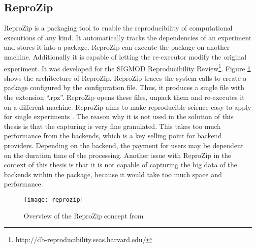 \documentclass[draft,final]{vutinfth} %
\begin{document}
\subsection{ReproZip}\label{ReproZip}
ReproZip is a packaging tool to enable the reproducibility of computational executions of any kind. It automatically tracks the dependencies of an experiment and stores it into a package. ReproZip can execute the package on another machine. Additionally it is capable of letting the re-executor modify the original experiment. It was developed for the SIGMOD Reproducibility Review\footnote{http://db-reproducibility.seas.harvard.edu/}. Figure \ref{fig:reprozip} shows the architecture of ReproZip. ReproZip traces the system calls to create a package configured by the configuration file. Thus, it produces a single file with the extension “.rpz”. ReproZip opens these files, unpack them and re-executes it on a different machine. ReproZip aims to make reproducible science easy to apply for single experiments \cite{29c5846926a4497d95f276604cb0368c}. The reason why it is not used in the solution of this thesis is that the capturing is very fine granulated. This takes too much performance from the backends, which is a key selling point for backend providers. Depending on the backend, the payment for users may be dependent on the duration time of the processing. Another issue with ReproZip in the context of this thesis is that it is not capable of capturing the big data of the backends within the package, because it would take too much space and performance.   

\begin{figure}[h]
	\centering
	\texttt{[image: reprozip]}
	\caption{Overview of the ReproZip concept from \cite{29c5846926a4497d95f276604cb0368c} }
	\label{fig:reprozip} %
\end{figure}
\end{document}
